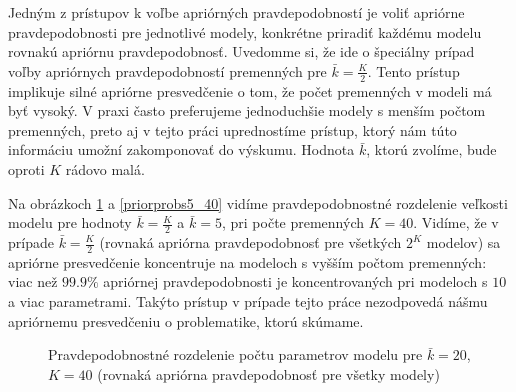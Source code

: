 Jedným z prístupov k voľbe apriórných pravdepodobností je voliť apriórne pravdepodobnosti pre jednotlivé modely,
konkrétne priradiť každému modelu rovnakú apriórnu pravdepodobnosť.
Uvedomme si, že ide o špeciálny prípad voľby apriórnych pravdepodobností premenných pre \(\bar{k} = \frac{K}{2}\).
Tento prístup implikuje silné apriórne presvedčenie o tom, že počet premenných v modeli má byť vysoký.
V praxi často preferujeme jednoduchšie modely s menším počtom premenných, preto aj v tejto práci uprednostíme prístup,
ktorý nám túto informáciu umožní zakomponovať do výskumu.
Hodnota \(\bar{k}\), ktorú zvolíme, bude oproti \(K\) rádovo malá.

Na obrázkoch \ref{priorprobs20_40} a \ref{priorprobs5_40} vidíme pravdepodobnostné rozdelenie veľkosti modelu pre hodnoty \(\bar{k} = \frac{K}{2}\) a \(\bar{k} = 5\),
pri počte premenných \(K = 40\).
Vidíme, že v prípade \(\bar{k} = \frac{K}{2}\) (rovnaká apriórna pravdepodobnosť pre všetkých \(2^K\) modelov)
sa apriórne presvedčenie koncentruje na modeloch s vyšším počtom premenných: viac než \(99.9 \%\)
apriórnej pravdepodobnosti je koncentrovaných pri modeloch s \(10\) a viac parametrami.
Takýto prístup v prípade tejto práce nezodpovedá nášmu apriórnemu presvedčeniu o problematike, ktorú skúmame.

\begin{figure}[H]
\caption{Pravdepodobnostné rozdelenie počtu parametrov modelu pre \(\bar{k} = 20\), \(K = 40\) (rovnaká apriórna pravdepodobnosť pre všetky modely)}
\label{priorprobs20_40}
\end{figure}

